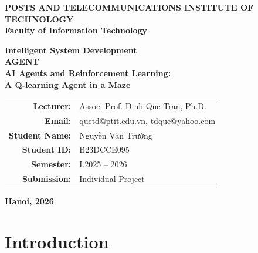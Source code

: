 \documentclass[11pt, a4paper]{article}
\begin{document}
\begin{titlepage}
\begin{center}

\vspace*{0.5cm}

\Large
\textbf{POSTS AND TELECOMMUNICATIONS INSTITUTE OF TECHNOLOGY}\\
\textbf{Faculty of Information Technology}

\vspace{2.0cm}

\Huge
\textbf{Intelligent System Development}\\
\vspace{0.4cm}
\LARGE
\textbf{AGENT}\\
\vspace{0.6cm}
\Large
\textbf{AI Agents and Reinforcement Learning:\\A Q-learning Agent in a Maze}

\vspace{1.2cm}

\vfill

\normalsize
\begin{tabular}{rl}
\textbf{Lecturer:} & Assoc. Prof. Dinh Que Tran, Ph.D. \\
\textbf{Email:} & quetd@ptit.edu.vn, tdque@yahoo.com \\[0.8cm]
\textbf{Student Name:} & Nguyễn Văn Trường \\
\textbf{Student ID:} & B23DCCE095 \\
\textbf{Semester:} & I.2025 -- 2026 \\
\textbf{Submission:} & Individual Project \\
\end{tabular}

\vfill

\textbf{Hanoi, 2026}

\vspace{0.5cm}

\end{center}
\end{titlepage}

{\small\tableofcontents}
\newpage

\section{Introduction}
\end{document}
